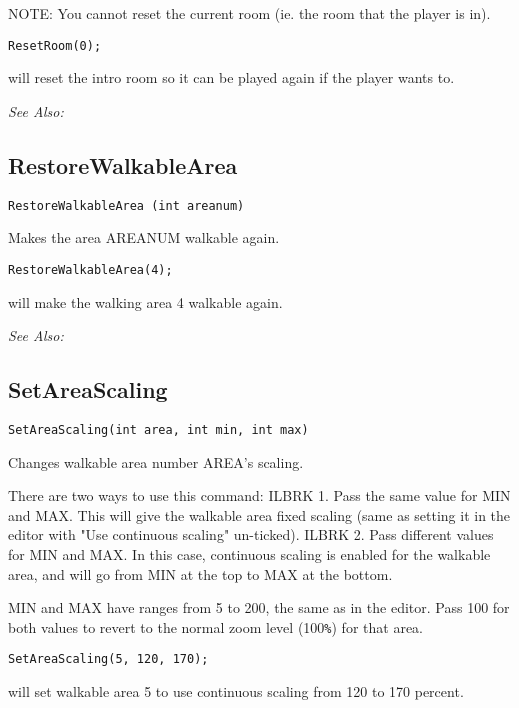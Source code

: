 NOTE: You cannot reset the current room (ie. the room that the player is in).

\begin{verbatim}
ResetRoom(0);
\end{verbatim}
will reset the intro room so it can be played again if the player wants to.

\it{See Also:} 


\subsection{RestoreWalkableArea}\label{RestoreWalkableArea}%

\begin{verbatim}
RestoreWalkableArea (int areanum)
\end{verbatim}
Makes the area AREANUM walkable again.

\begin{verbatim}
RestoreWalkableArea(4);
\end{verbatim}
will make the walking area 4 walkable again.

\it{See Also:} 


\subsection{SetAreaScaling}\label{SetAreaScaling}%

\begin{verbatim}
SetAreaScaling(int area, int min, int max)
\end{verbatim}
Changes walkable area number AREA's scaling.

There are two ways to use this command: ILBRK
1. Pass the same value for MIN and MAX. This will give the walkable area fixed
scaling (same as setting it in the editor with "Use continuous scaling" un-ticked). ILBRK
2. Pass different values for MIN and MAX. In this case, continuous scaling is
enabled for the walkable area, and will go from MIN at the top to MAX at the bottom.

MIN and MAX have ranges from 5 to 200, the same as in the editor. Pass 100 for both values
to revert to the normal zoom level (100\verb$%$) for that area.

\begin{verbatim}
SetAreaScaling(5, 120, 170);
\end{verbatim}
will set walkable area 5 to use continuous scaling from 120 to 170 percent.


